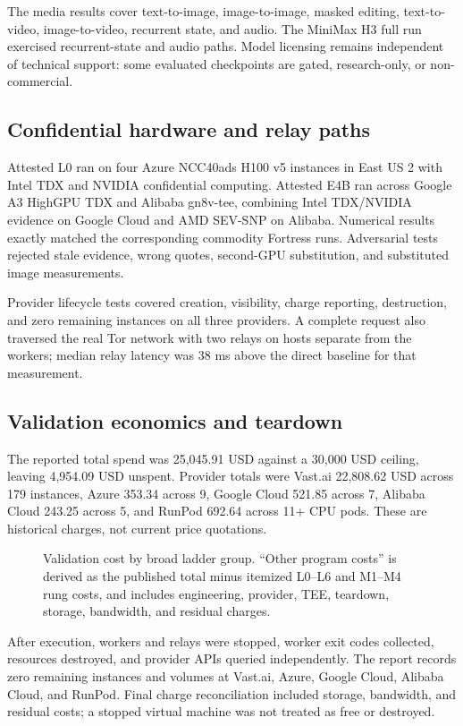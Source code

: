 The media results cover text-to-image, image-to-image, masked editing, text-to-video, image-to-video, recurrent state, and audio. The MiniMax H3 full run exercised recurrent-state and audio paths. Model licensing remains independent of technical support: some evaluated checkpoints are gated, research-only, or non-commercial.

\subsection{Confidential hardware and relay paths}

Attested L0 ran on four Azure NCC40ads H100 v5 instances in East US 2 with Intel TDX and NVIDIA confidential computing. Attested E4B ran across Google A3 HighGPU TDX and Alibaba gn8v-tee, combining Intel TDX/NVIDIA evidence on Google Cloud and AMD SEV-SNP on Alibaba. Numerical results exactly matched the corresponding commodity Fortress runs. Adversarial tests rejected stale evidence, wrong quotes, second-GPU substitution, and substituted image measurements.

Provider lifecycle tests covered creation, visibility, charge reporting, destruction, and zero remaining instances on all three providers. A complete request also traversed the real Tor network with two relays on hosts separate from the workers; median relay latency was 38 ms above the direct baseline for that measurement.

\subsection{Validation economics and teardown}

The reported total spend was 25,045.91 USD against a 30,000 USD ceiling, leaving 4,954.09 USD unspent. Provider totals were Vast.ai 22,808.62 USD across 179 instances, Azure 353.34 across 9, Google Cloud 521.85 across 7, Alibaba Cloud 243.25 across 5, and RunPod 692.64 across 11+ CPU pods. These are historical charges, not current price quotations.

\begin{figure}[htbp]
\centering
\resizebox{\linewidth}{!}{}
\caption{Validation cost by broad ladder group. ``Other program costs'' is derived as the published total minus itemized L0--L6 and M1--M4 rung costs, and includes engineering, provider, TEE, teardown, storage, bandwidth, and residual charges.}
\label{fig:costs}
\end{figure}

After execution, workers and relays were stopped, worker exit codes collected, resources destroyed, and provider APIs queried independently. The report records zero remaining instances and volumes at Vast.ai, Azure, Google Cloud, Alibaba Cloud, and RunPod. Final charge reconciliation included storage, bandwidth, and residual costs; a stopped virtual machine was not treated as free or destroyed.
